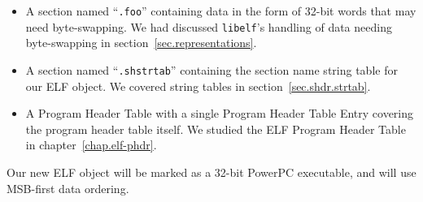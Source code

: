 \documentclass[a4paper,pdftex]{book}
\newcommand{\code}[1]{\texttt{#1}}
\newcommand{\library}[1]{\texttt{#1}}
\newcommand{\trade}{\texttrademark\xspace}
\newcommand{\elfdatastructure}[1]{\textsf{#1}}
\begin{document}
\begin{itemize}
\item A section named ``\code{.foo}'' containing data in the form
  of 32-bit words that may need byte-swapping. We had discussed
  \library{libelf}'s handling of data needing byte-swapping in
  section~\vref{sec.representations}.
\item A section named ``\code{.shstrtab}'' containing the section
  name string table for our ELF object. We covered string tables
  in section~\vref{sec.shdr.strtab}.
\item A \elfdatastructure{Program Header Table} with a single
  \elfdatastructure{Program Header Table Entry} covering the program
  header table itself. We studied the ELF \elfdatastructure{Program
    Header Table} in chapter~\ref{chap.elf-phdr}.
\end{itemize}

Our new ELF object will be marked as a 32-bit PowerPC\trade
executable, and will use MSB-first data ordering.
\end{document}
